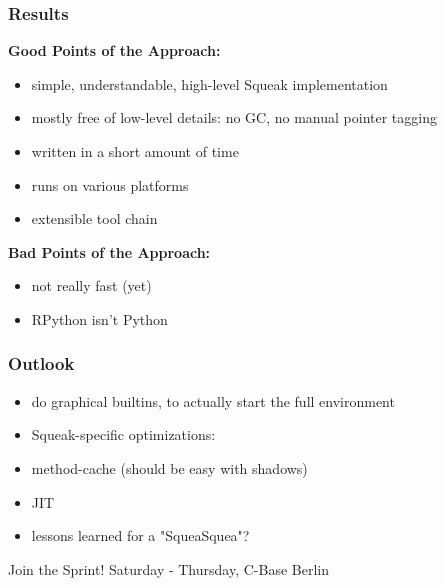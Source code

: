 \documentclass[utf8x]{beamer}
\begin{document}

\begin{frame}
    \frametitle{Results}
    {\bf Good Points of the Approach:}
    \begin{itemize}
    \item simple, understandable, high-level Squeak implementation
    \item mostly free of low-level details: no GC, no manual pointer tagging
    \item written in a short amount of time
    \item runs on various platforms
    \item extensible tool chain
    \end{itemize}
    \pause
    {\bf Bad Points of the Approach:}
    \begin{itemize}
    \item not really fast (yet)
    \item RPython isn't Python
    \end{itemize}
\end{frame}

\begin{frame}
    \frametitle{Outlook}
    \begin{itemize}
    \item do graphical builtins, to actually start the full environment
    \item Squeak-specific optimizations:
    \item method-cache (should be easy with shadows)
    \item JIT
    \item lessons learned for a "SqueaSquea"?
    \end{itemize}
  \begin{block}{
    Join the Sprint!}
    \bigskip
    \hskip 1cm Saturday - Thursday, C-Base Berlin
    \bigskip
  \end{block}
\end{frame}
\end{document}
